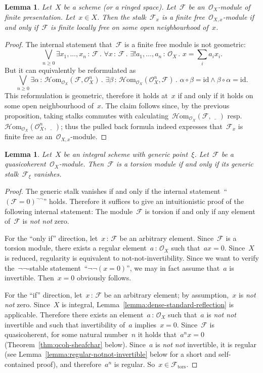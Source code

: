 \documentclass[10pt]{amsart}
\makeatletter
\theoremstyle{definition}
\theoremstyle{plain}
\newtheorem{lemma}[defn]{Lemma}
\theoremstyle{remark}
\newcommand{\F}{\mathcal{F}}
\renewcommand{\O}{\mathcal{O}}
\newcommand{\HOM}{\mathcal{H}\mathrm{om}}
\newcommand{\id}{\mathrm{id}}
\newcommand{\placeholder}{\underline{\quad}}
\newcommand{\tors}{\mathrm{tors}}
\newcommand{\?}{\,{:}\,}
\renewcommand{\_}{\mathpunct{.}\,}
\newcommand{\resp}{resp.\@\xspace}
\newcommand{\notnot}{\emph{not not}\xspace}
\makeatother
\begin{document}
\begin{lemma}Let~$X$ be a scheme (or a ringed space). Let~$\F$ be an~$\O_X$-module of finite
presentation. Let~$x \in X$. Then the stalk~$\F_x$ is a finite
free~$\O_{X,x}$-module if and only if~$\F$ is finite locally free on some open
neighbourhood of~$x$.\end{lemma}
\begin{proof}The internal statement that~$\F$ is a finite free module is not geometric:
\[ \bigvee_{n \geq 0}
  \exists x_1,\ldots,x_n\?\F\_
  \forall x\?\F\_
  \exists! a_1,\ldots,a_n\?\O_X\_
  x = \textstyle\sum_i a_i x_i. \]
But it can equivalently be reformulated as
\[ \bigvee_{n \geq 0}
  \exists \alpha\?\HOM_{\O_X}(\F,\O_X^n)\_
  \exists \beta\?\HOM_{\O_X}(\O_X^n,\F)\_
  \alpha \circ \beta = \id \wedge \beta \circ \alpha = \id. \]
This reformulation is geometric, therefore it holds at~$x$ if and only if it
holds on some open neighbourhood of~$x$. The claim follows since, by the
previous proposition, taking stalks commutes with
calculating~$\HOM_{\O_X}(\F,\placeholder)$ \resp~$\HOM_{\O_X}(\O_X^n,\placeholder)$;
thus the pulled back formula indeed expresses that~$\F_x$ is finite free as
an~$\O_{X,x}$-module.
\end{proof}

\begin{lemma}\label{lemma:torsion-module-generic-stalk}
Let~$X$ be an integral scheme with generic point~$\xi$. Let~$\F$
be a quasicoherent~$\O_X$-module. Then~$\F$ is a torsion module if and only if
its generic stalk~$\F_\xi$ vanishes.
\end{lemma}
\begin{proof}The generic stalk vanishes if and only if the internal
statement~``$(\F = 0)^{\neg\neg}$'' holds. Therefore it suffices to give an
intuitionistic proof of the following internal statement: The module~$\F$ is
torsion if and only if any element of~$\F$ is \notnot zero.

For the ``only if'' direction, let~$x\?\F$ be an arbitrary element. Since~$\F$
is a torsion module, there exists a regular element~$a\?\O_X$ such that~$ax =
0$. Since~$X$ is reduced, regularity is equivalent to not-not-invertibility.
Since we want to verify the~$\neg\neg$-stable statement~``$\neg\neg(x = 0)$'', we
may in fact assume that~$a$ is invertible. Then~$x = 0$ obviously follows.

For the ``if'' direction, let~$x\?\F$ be an arbitrary element; by assumption,~$x$
is \notnot zero. Since~$X$ is integral,
Lemma~\ref{lemma:dense-standard-reflection} is applicable. Therefore there
exists an element~$a\?\O_X$ such that~$a$ is \notnot invertible and such that
invertibility of~$a$ implies~$x = 0$. Since~$\F$ is quasicoherent, for some
natural number~$n$ it holds that~$a^n x = 0$ (Theorem~\ref{thm:qcoh-sheafchar}
below). Since~$a$ is \notnot invertible,
it is regular (see Lemma~\ref{lemma:regular-notnot-invertible} below for a short
and self-contained proof), and therefore~$a^n$ is regular. So~$x \in \F_\tors$.
\end{proof}
\end{document}
